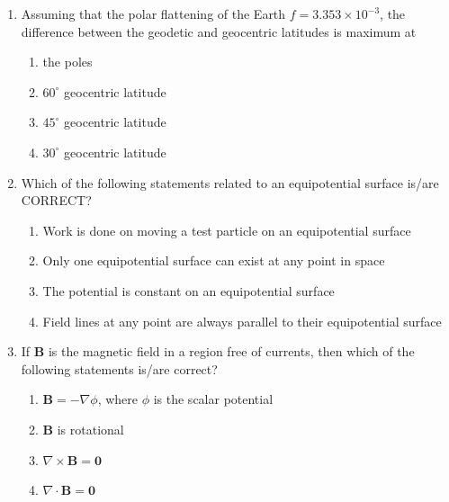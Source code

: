\documentclass[journal,12pt,onecolumn]{IEEEtran}
\begin{document}
\begin{enumerate}
\begin{multicols}{2}
\begin{enumerate}
\item explicit and linear
\item implicit and linear
\item explicit and non-linear
\item implicit and non-linear
\end{enumerate}
\end{multicols}

\item Assuming that the polar flattening of the Earth $f=3.353\times10^{-3}$, the difference between the geodetic and geocentric latitudes is maximum at  

\hfill{}

\begin{multicols}{2}
\begin{enumerate}
\item the poles
\item $60^\circ$ geocentric latitude
\item $45^\circ$ geocentric latitude
\item $30^\circ$ geocentric latitude
\end{enumerate}
\end{multicols}

\item Which of the following statements related to an equipotential surface is/are CORRECT?  

\hfill{}


\begin{enumerate}
\item Work is done on moving a test particle on an equipotential surface
\item Only one equipotential surface can exist at any point in space
\item The potential is constant on an equipotential surface
\item Field lines at any point are always parallel to their equipotential surface
\end{enumerate}


\item If $\mathbf{B}$ is the magnetic field in a region free of currents, then which of the following statements is/are correct?  

\hfill{}

\begin{multicols}{2}
\begin{enumerate}
\item $\mathbf{B}=-\nabla\phi$, where $\phi$ is the scalar potential
\item $\mathbf{B}$ is rotational
\item $\nabla\times\mathbf{B}=\mathbf{0}$
\item $\nabla\cdot\mathbf{B}=\mathbf{0}$
\end{enumerate}
\end{multicols}


\end{enumerate}
\end{document}
